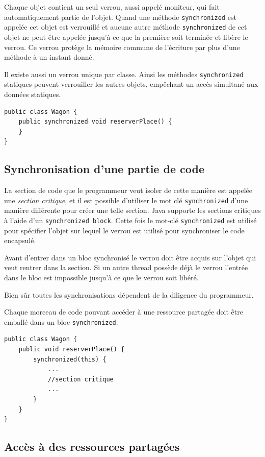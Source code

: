 \documentclass[a4paper,11pt]{report}
\begin{document}
Chaque objet contient un seul verrou, aussi appelé moniteur, qui fait automatiquement partie de l\rq{}objet. Quand une méthode \texttt{synchronized} est appelée cet objet est verrouillé et aucune autre méthode \texttt{synchronized} de cet objet ne peut être appelée jusqu\rq{}à ce que la première soit terminée et libère le verrou. Ce verrou protège la mémoire commune de l\rq{}écriture par plus d\rq{}une méthode à un instant donné.

Il existe aussi un verrou unique par classe. Ainsi les méthodes \texttt{synchronized} statiques peuvent verrouiller les autres objets, empêchant un accès simultané aux données statiques.

\begin{lstlisting}
public class Wagon {
	public synchronized void reserverPlace() {
	}
}
\end{lstlisting}


\subsection{Synchronisation d\rq{}une partie de code}

La section de code que le programmeur veut isoler de cette manière est appelée une \emph{section critique}, et il est possible d\rq{}utiliser le mot clé \texttt{synchronized} d\rq{}une manière différente pour créer une telle section. Java supporte les sections critiques à l\rq{}aide d\rq{}un \texttt{synchronized block}. Cette fois le mot-clé \texttt{synchronized} est utilisé pour spécifier l\rq{}objet sur lequel le verrou est utilisé pour synchroniser le code encapsulé.

Avant d\rq{}entrer dans un bloc synchronisé le verrou doit être acquis sur l\rq{}objet qui veut rentrer dans la section. Si un autre thread possède déjà le verrou l\rq{}entrée dans le bloc est impossible jusqu\rq{}à ce que le verrou soit libéré.

Bien sûr toutes les synchronisations dépendent de la diligence du programmeur.

Chaque morceau de code pouvant accéder à une ressource partagée doit être emballé dans un bloc \texttt{synchronized}.

\begin{lstlisting}
public class Wagon {
	public void reserverPlace() {
		synchronized(this) {
			...
			//section critique
			...
		}
	}
}
\end{lstlisting}


\subsection{Accès à des ressources partagées}
\end{document}

